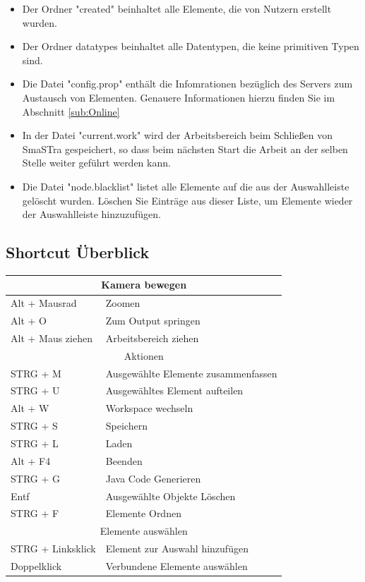 \begin{itemize}
	\item Der Ordner "created" beinhaltet alle Elemente, die von Nutzern erstellt wurden.
	\item Der Ordner datatypes beinhaltet alle Datentypen, die keine primitiven Typen sind.
	\item Die Datei "config.prop" enth\"alt die Infomrationen bez\"uglich des Servers zum Austausch von Elementen. Genauere Informationen hierzu finden Sie im Abschnitt \ref{sub:Online}
	\item In der Datei "current.work" wird der Arbeitsbereich beim Schlie{\ss}en von SmaSTra gespeichert, so dass beim n\"achsten Start die Arbeit an der selben Stelle weiter gef\"uhrt werden kann.
	\item Die Datei "node.blacklist" listet alle Elemente auf die aus der Auswahlleiste gel\"oscht wurden. L\"oschen Sie Eintr\"age aus dieser Liste, um Elemente wieder der Auswahlleiste hinzuzuf\"ugen.
\end{itemize}

\subsection{Shortcut \"Uberblick} \label{sub:Shortcuts}

\begin{table}[h!]
    \myfloatalign
	  \begin{tabularx}{\textwidth}{| X l |}
		\multicolumn{2}{c}{Kamera bewegen} \\
		\hline
	   Alt + Mausrad  & Zoomen \\ \hline
	   Alt + O  & Zum Output springen \\ \hline
	   Alt + Maus ziehen  & Arbeitsbereich ziehen \\ \hline 
		\multicolumn{2}{c}{ Aktionen} \\
		\hline
	   STRG + M  & Ausgew\"ahlte Elemente zusammenfassen \\ \hline
	   STRG + U  & Ausgew\"ahltes Element aufteilen \\ \hline
	   Alt + W  & Workspace wechseln \\ \hline
	   STRG + S  & Speichern \\ \hline
	   STRG + L  & Laden \\ \hline
	   Alt + F4  & Beenden \\ \hline
		 STRG + G & Java Code Generieren \\ \hline
		 Entf & Ausgew\"ahlte Objekte L\"oschen \\ \hline
		 STRG + F & Elemente Ordnen \\ \hline
		\multicolumn{2}{c}{Elemente ausw\"ahlen} \\
		\hline
		 STRG + Linksklick & Element zur Auswahl hinzuf\"ugen \\ \hline
		 Doppelklick & Verbundene Elemente ausw\"ahlen \\ \hline
	  \end{tabularx}
\end{table}

\paragraph{}